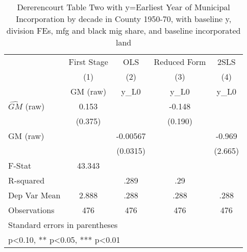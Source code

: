 \begin{table}[htbp]\centering
\def\sym#1{\ifmmode^{#1}\else\(^{#1}\)\fi}
\caption{Dererencourt Table Two with y=Earliest Year of Municipal Incorporation by decade in County 1950-70, with baseline y, division FEs, mfg and black mig share, and baseline incorporated land}
\begin{tabular}{l*{4}{c}}
\toprule
                    & First Stage   &         OLS   &Reduced Form   &        2SLS   \\
                    &\multicolumn{1}{c}{(1)}&\multicolumn{1}{c}{(2)}&\multicolumn{1}{c}{(3)}&\multicolumn{1}{c}{(4)}\\
                    &\multicolumn{1}{c}{GM  (raw)}&\multicolumn{1}{c}{y\_L0}&\multicolumn{1}{c}{y\_L0}&\multicolumn{1}{c}{y\_L0}\\
\midrule
$\hat{GM}$ (raw)    &       0.153   &               &      -0.148   &               \\
                    &     (0.375)   &               &     (0.190)   &               \\
\addlinespace
GM  (raw)           &               &    -0.00567   &               &      -0.969   \\
                    &               &    (0.0315)   &               &     (2.665)   \\
\midrule
F-Stat              &      43.343   &               &               &               \\
R-squared           &               &        .289   &         .29   &               \\
Dep Var Mean        &       2.888   &        .288   &        .288   &        .288   \\
Observations        &         476   &         476   &         476   &         476   \\
\bottomrule
\multicolumn{5}{l}{\footnotesize Standard errors in parentheses}\\
\multicolumn{5}{l}{\footnotesize * p<0.10, ** p<0.05, *** p<0.01}\\
\end{tabular}
\end{table}
